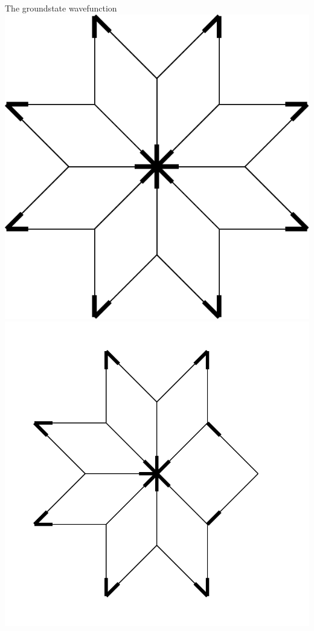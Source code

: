 \documentclass[xcolor=x11names,compress,professionalfonts, aspectratio=169]{beamer}
\renewcommand{\(}{\begin{columns}}
\renewcommand{\)}{\end{columns}}
\newcommand{\<}[1]{\begin{column}{#1}}
\renewcommand{\>}{\end{column}}
\begin{document}
\begin{frame}{The groundstate wavefunction}
{\includegraphics[scale=\s]{img/env_A.pdf}
\includegraphics[scale=\s]{img/env_B.pdf}
}
\end{frame}
\end{document}
